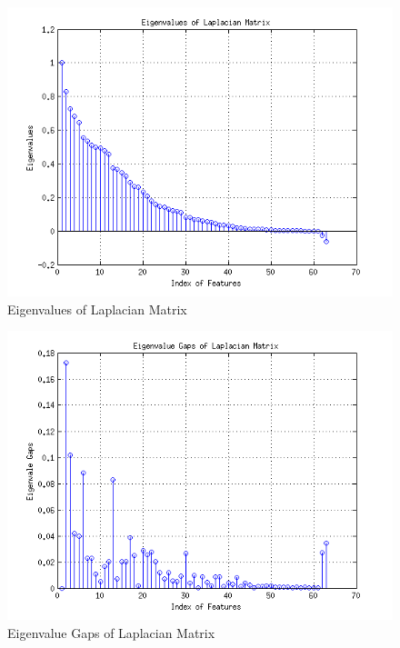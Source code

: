 \documentclass{article}
\begin{document}
\begin{figure}
\centering
	\includegraphics[width=1.\linewidth]{plt_eigenvalues.png}
	\caption{Eigenvalues of Laplacian Matrix}
	\label{fig_1}
\end{figure}

\begin{figure}
\centering
	\includegraphics[width=1.\linewidth]{plt_eigenvalue_gaps.png}
	\caption{Eigenvalue Gaps of Laplacian Matrix}
	\label{fig_2}
\end{figure}
\end{document}
